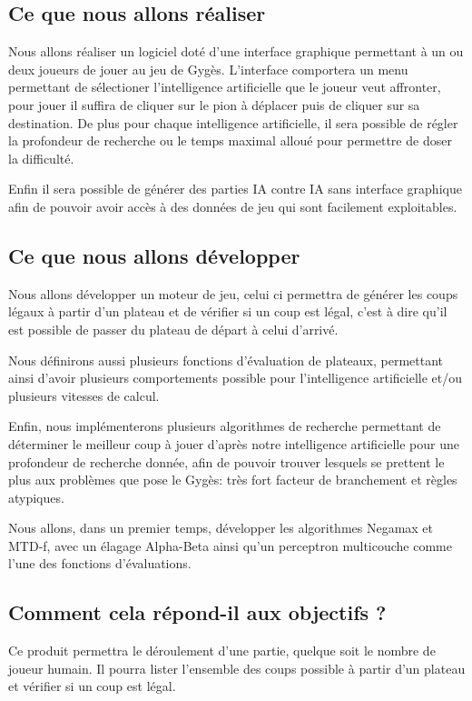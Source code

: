 \documentclass[a4paper]{article}
\begin{document}
	\subsection{Ce que nous allons réaliser}
		Nous allons réaliser un logiciel doté d'une interface graphique permettant à un ou deux joueurs
		de jouer au jeu de Gygès. L'interface comportera un menu permettant de sélectioner l'intelligence
		artificielle que le joueur veut affronter, pour jouer il suffira de cliquer sur le pion à déplacer
		puis de cliquer sur sa destination. De plus pour chaque intelligence artificielle, il sera possible
		de régler la profondeur de recherche ou le temps maximal alloué pour permettre de doser la difficulté.


		\vspace{1em}
		Enfin il sera possible de générer des parties IA contre IA sans interface graphique
		afin de pouvoir avoir accès à des données de jeu qui sont facilement exploitables.

	\subsection{Ce que nous allons développer}
		Nous allons développer un moteur de jeu, celui ci permettra de générer les coups légaux à partir d'un plateau
		et de vérifier si un coup est légal, c'est à dire qu'il est possible de passer du plateau de départ à celui
		d'arrivé.


		Nous définirons aussi plusieurs fonctions d'évaluation de plateaux, permettant ainsi d'avoir plusieurs
		comportements possible pour l'intelligence artificielle et/ou plusieurs vitesses de calcul.

		Enfin, nous implémenterons plusieurs algorithmes de recherche permettant de déterminer le meilleur coup à jouer
		d'après notre intelligence artificielle pour une profondeur	de recherche donnée, afin de pouvoir trouver lesquels
		se prettent le plus aux problèmes que pose le Gygès: très fort facteur de branchement et règles atypiques.

		\vspace{1em}
		Nous allons, dans un premier temps, développer les algorithmes Negamax et MTD-f, avec un élagage Alpha-Beta ainsi
		qu'un perceptron multicouche comme l'une des fonctions d'évaluations.

	\subsection{Comment cela répond-il aux objectifs ?}
		Ce produit permettra le déroulement d'une partie, quelque soit le nombre de joueur humain.
		Il pourra lister l'ensemble des coups possible à partir d'un plateau et vérifier
		si un coup est légal.
\end{document}
